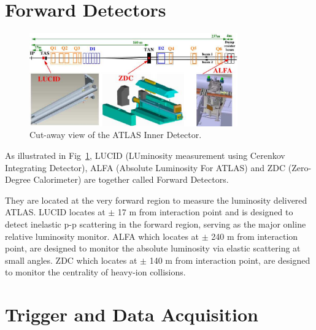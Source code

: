 \section{Forward Detectors}
\label{sec:for}
\begin{figure}[htbp]
 \begin{center}
 \includegraphics[width=0.8\textwidth]{chapters/c4/figures/forward}
 \end{center}
 \caption{Cut-away view of the ATLAS Inner Detector.}

 \label{fig:forward}
\end{figure}
\par As illustrated in Fig~\ref{fig:forward}, LUCID (LUminosity measurement using Cerenkov Integrating Detector), ALFA (Absolute Luminosity For ATLAS) and ZDC 
 (Zero-Degree Calorimeter) are together called Forward Detectors. 
 \par They are located at the very forward region to measure the luminosity delivered ATLAS. LUCID locates at $\pm$ 17 m from interaction point and is designed to 
 detect inelastic p-p scattering in the forward region, serving as the major online relative luminosity monitor. 
 ALFA which locates at $\pm$ 240 m from interaction point, are designed to monitor the absolute luminosity via elastic scattering at small angles. 
 ZDC which locates at $\pm$ 140 m from interaction point, are designed to monitor the centrality of heavy-ion collisions.

\section{Trigger and Data Acquisition}

\label{sec:data}

